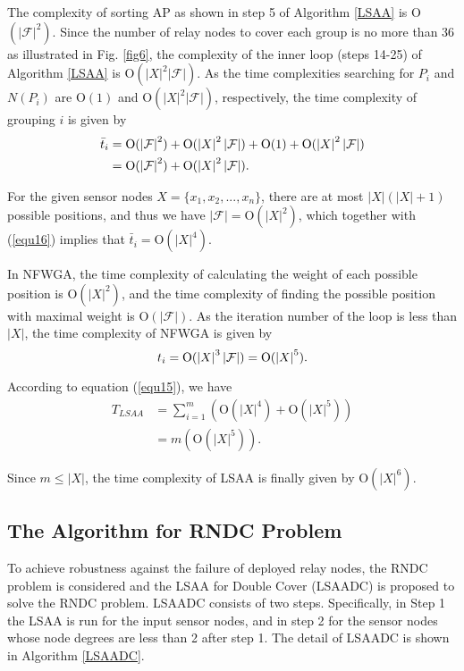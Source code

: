 \documentclass[journal]{IEEEtran}
\begin{document}
The complexity of sorting AP as shown in step 5 of Algorithm \ref{LSAA} is O$(|\mathcal{F}|^2)$. Since the number of relay nodes to cover each group is no more than 36 as illustrated in Fig. \ref{fig6}, the complexity of the inner loop (steps 14-25) of Algorithm \ref{LSAA} is O$(|X|^2|\mathcal{F}|)$. As the time complexities searching for $P_i$ and $N(P_i)$ are O$(1)$ and O$(|X|^2|\mathcal{F}|)$, respectively, the time complexity of grouping $i$ is given by
\begin{equation}\label{equ16}
\begin{split}
{{\bar t}_i} &= \mathrm{O}({\left| {\cal F} \right|^2}) + \mathrm{O}({\left| X \right|^2}\left| {\cal F} \right|) + \mathrm{O}(1) + \mathrm{O}({\left| X \right|^2}\left| {\cal F} \right|)\\
 &= \mathrm{O}({\left| {\cal F} \right|^2}) + \mathrm{O}({\left| X \right|^2}\left| {\cal F} \right|).
 \end{split}
\end{equation}

For the given sensor nodes $X=\{x_1, x_2,...,x_n\}$, there are at most $|X|(|X|+1)$ possible positions, and thus we have $|\mathcal{F}|=\mathrm{O}(|X|^2)$, which together with (\ref{equ16}) implies that $\bar{t}_i=\mathrm{O}(|X|^4)$.

In NFWGA, the time complexity of calculating the weight of each possible position is $\mathrm{O}(|X|^2)$, and the time complexity of finding the possible position with maximal weight is $\mathrm{O}(|\mathcal{F}|)$. As the iteration number of the loop is less than $|X|$, the time complexity of NFWGA is given by
\begin{equation}\label{equ17}
{t_i} = \mathrm{O}({\left| X \right|^3}\left| {\cal F} \right|) = \mathrm{O}({\left| X \right|^5}).
\end{equation}

According to equation (\ref{equ15}), we have
\begin{equation}\label{euq18}
\begin{split}
T_{LSAA} &= \sum\limits_{i = 1}^m {\left( {\mathrm{O}({{\left| X \right|}^4}) + \mathrm{O}({{\left| X \right|}^5})} \right)} \\
 &= m\left( {\mathrm{O}({{\left| X \right|}^5})} \right).
\end{split}
\end{equation}

Since $m\leq |X|$, the time complexity of LSAA is finally given by $\mathrm{O}(|X|^6)$.

\subsection{The Algorithm for RNDC Problem}
To achieve robustness against the failure of deployed relay nodes, the RNDC problem is considered and the LSAA for Double Cover (LSAADC) is proposed to solve the RNDC problem. LSAADC consists of two steps. Specifically, in Step 1 the LSAA is run for the input sensor nodes, and in step 2 for the sensor nodes whose node degrees are less than 2 after step 1. The detail of LSAADC is shown in Algorithm \ref{LSAADC}.
\end{document}
